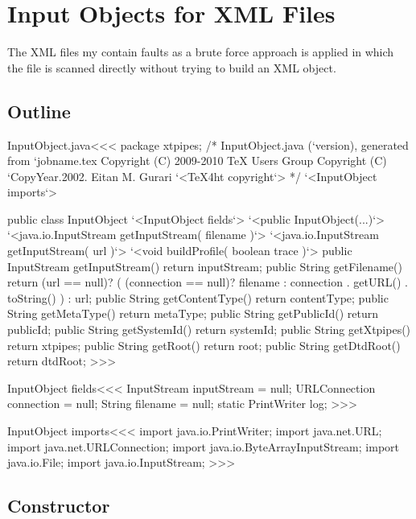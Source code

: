 \documentclass{article}
\begin{document}
\section{Input Objects for  XML Files}

The XML files my contain faults as a brute force approach is applied in
which the file is scanned directly without trying to build an XML object.

\subsection{Outline}

% 


\<InputObject.java\><<<
package xtpipes;
/* InputObject.java (`version), generated from `jobname.tex
   Copyright (C) 2009-2010 TeX Users Group
   Copyright (C) `CopyYear.2002. Eitan M. Gurari
`<TeX4ht copyright`> */
`<InputObject imports`>

public class InputObject{
      `<InputObject fields`>
   `<public InputObject(...)`>
   `<java.io.InputStream getInputStream( filename )`>
   `<java.io.InputStream getInputStream( url )`>
   `<void buildProfile( boolean trace )`>
   public InputStream getInputStream(){ return inputStream; }
   public String getFilename(){
      return (url == null)?
         ( (connection == null)? filename
                               :
                                 connection . getURL() . toString()
         )
       : url;
   }
   public String getContentType(){ return contentType; }
   public String getMetaType(){ return metaType; }
   public String getPublicId(){ return publicId; }
   public String getSystemId(){ return systemId; }
   public String getXtpipes(){ return xtpipes; }
   public String getRoot(){ return root; }
   public String getDtdRoot(){ return dtdRoot; }
}
>>>

\<InputObject fields\><<<
InputStream inputStream = null;
URLConnection connection = null;
String filename = null;
static PrintWriter log;
>>>

\<InputObject imports\><<<
import java.io.PrintWriter;
import java.net.URL;
import java.net.URLConnection;
import java.io.ByteArrayInputStream;
import java.io.File;
import java.io.InputStream;
>>>

\subsection{Constructor}
\end{document}
